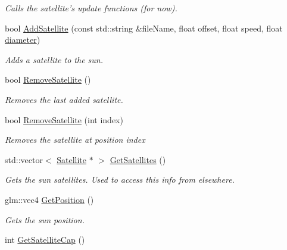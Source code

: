 \begin{DoxyCompactItemize}
\begin{DoxyCompactList}\small\item\em Calls the satellite's update functions (for now). \end{DoxyCompactList}\item 
bool \hyperlink{class_sun_aa83727a648f0456be4164fd6f2dc1e75}{Add\-Satellite} (const std\-::string \&file\-Name, float offset, float speed, float \hyperlink{class_sun_ac35fc9ebc427d9c8c9fd3ee3a12fce82}{diameter})
\begin{DoxyCompactList}\small\item\em Adds a satellite to the sun. \end{DoxyCompactList}\item 
\hypertarget{class_sun_a274dd9d397333db6a916582ac2a19c46}{bool \hyperlink{class_sun_a274dd9d397333db6a916582ac2a19c46}{Remove\-Satellite} ()}\label{class_sun_a274dd9d397333db6a916582ac2a19c46}

\begin{DoxyCompactList}\small\item\em Removes the last added satellite. \end{DoxyCompactList}\item 
\hypertarget{class_sun_ad0ab7130cbb46b50968efe2d770c4b21}{bool \hyperlink{class_sun_ad0ab7130cbb46b50968efe2d770c4b21}{Remove\-Satellite} (int index)}\label{class_sun_ad0ab7130cbb46b50968efe2d770c4b21}

\begin{DoxyCompactList}\small\item\em Removes the satellite at position {\ttfamily index} \end{DoxyCompactList}\item 
\hypertarget{class_sun_a69fc54810b99f61d33be2dafafa3273d}{std\-::vector$<$ \hyperlink{class_satellite}{Satellite} $\ast$ $>$ \hyperlink{class_sun_a69fc54810b99f61d33be2dafafa3273d}{Get\-Satellites} ()}\label{class_sun_a69fc54810b99f61d33be2dafafa3273d}

\begin{DoxyCompactList}\small\item\em Gets the sun satellites. Used to access this info from elsewhere. \end{DoxyCompactList}\item 
\hypertarget{class_sun_a8b531f7cf5b4b39ab1f5f453894f52bd}{glm\-::vec4 \hyperlink{class_sun_a8b531f7cf5b4b39ab1f5f453894f52bd}{Get\-Position} ()}\label{class_sun_a8b531f7cf5b4b39ab1f5f453894f52bd}

\begin{DoxyCompactList}\small\item\em Gets the sun position. \end{DoxyCompactList}\item 
\hypertarget{class_sun_a703c794dafe926c6c41f8d8ee3f6c5a2}{int \hyperlink{class_sun_a703c794dafe926c6c41f8d8ee3f6c5a2}{Get\-Satellite\-Cap} ()}\label{class_sun_a703c794dafe926c6c41f8d8ee3f6c5a2}


\end{DoxyCompactItemize}
